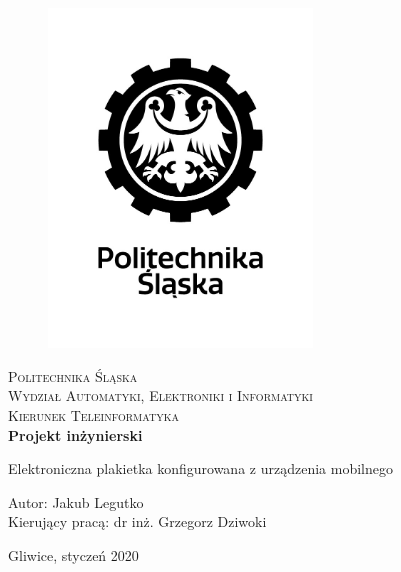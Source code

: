 \documentclass[a4paper,12pt, twoside]{article}
\begin{document}
    	\newpage
    	\thispagestyle{empty}
    	\begin{center}
    		
    		\begin{figure}
    			\centering
    			\includegraphics[width=7cm]{images/polsl_logo.jpg}
    			\vspace{.5cm}
    		\end{figure}
    		
    		{\fontsize{17}{17}\selectfont
    			\textsc{Politechnika Śląska \\[.3cm]
    				Wydział Automatyki, Elektroniki i Informatyki  \\[.3cm]
    				Kierunek Teleinformatyka  \\[1.5cm]}
    			\textbf{Projekt inżynierski \\[0.7cm]}}
    		
    		\Large
    		{Elektroniczna plakietka konfigurowana z urządzenia mobilnego \\[3.5cm]}
    		\Large{\begin{flushleft}
    				Autor: Jakub Legutko\\
    				Kierujący pracą: dr inż. Grzegorz Dziwoki\\[0.3cm]
    		\end{flushleft}}
    		
    		\normalsize
    		\vfill Gliwice, styczeń 2020
    	\end{center}
    	\newpage
    	\newpage
    	\thispagestyle{empty}
    	\tableofcontents
    	\newpage
    	\newpage
    	\clearpage
    	\setcounter{page}{1}
    	
\end{document}
